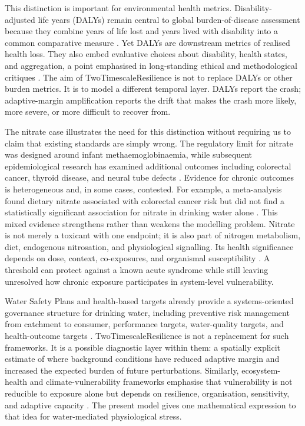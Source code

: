 	This distinction is important for environmental health metrics. Disability-adjusted life years (DALYs) remain central to global burden-of-disease assessment because they combine years of life lost and years lived with disability into a common comparative measure \citep{mathers2006burden}. Yet DALYs are downstream metrics of realised health loss. They also embed evaluative choices about disability, health states, and aggregation, a point emphasised in long-standing ethical and methodological critiques \citep{arnesen1999daly,solberg2020daly}. The aim of TwoTimescaleResilience is not to replace DALYs or other burden metrics. It is to model a different temporal layer. DALYs report the crash; adaptive-margin amplification reports the drift that makes the crash more likely, more severe, or more difficult to recover from.
	
	The nitrate case illustrates the need for this distinction without requiring us to claim that existing standards are simply wrong. The regulatory limit for nitrate was designed around infant methaemoglobinaemia, while subsequent epidemiological research has examined additional outcomes including colorectal cancer, thyroid disease, and neural tube defects \citep{ward2018nitrate}. Evidence for chronic outcomes is heterogeneous and, in some cases, contested. For example, a meta-analysis found dietary nitrate associated with colorectal cancer risk but did not find a statistically significant association for nitrate in drinking water alone \citep{hosseini2021nitrate}. This mixed evidence strengthens rather than weakens the modelling problem. Nitrate is not merely a toxicant with one endpoint; it is also part of nitrogen metabolism, diet, endogenous nitrosation, and physiological signalling. Its health significance depends on dose, context, co-exposures, and organismal susceptibility \citep{ward2018nitrate}. A threshold can protect against a known acute syndrome while still leaving unresolved how chronic exposure participates in system-level vulnerability.
	
	Water Safety Plans and health-based targets already provide a systems-oriented governance structure for drinking water, including preventive risk management from catchment to consumer, performance targets, water-quality targets, and health-outcome targets \citep{who2023wsp,who2022gdwq}. TwoTimescaleResilience is not a replacement for such frameworks. It is a possible diagnostic layer within them: a spatially explicit estimate of where background conditions have reduced adaptive margin and increased the expected burden of future perturbations. Similarly, ecosystem-health and climate-vulnerability frameworks emphasise that vulnerability is not reducible to exposure alone but depends on resilience, organisation, sensitivity, and adaptive capacity \citep{rapport1998ecosystem,hyman2024ccva}. The present model gives one mathematical expression to that idea for water-mediated physiological stress.
	
